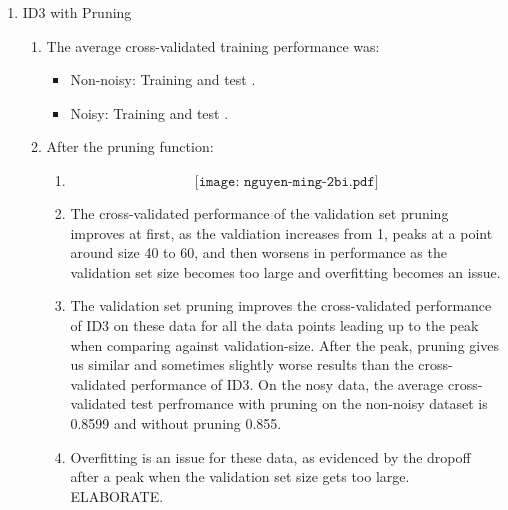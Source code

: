 \documentclass[11pt]{article}
\begin{document}
\begin{enumerate}
\item ID3 with Pruning
\begin{enumerate}
\item The average cross-validated training performance was:
	\begin{itemize}
	\item Non-noisy: Training  and test .
	\item Noisy: Training  and test .
	\end{itemize}
\item After the pruning function:
	\begin{enumerate}
	\item $$\texttt{[image: nguyen-ming-2bi.pdf]}$$
	\item The cross-validated performance of the validation set pruning improves at first, as the valdiation increases from 1, peaks at a point around size 40 to 60, and then worsens in performance as the validation set size becomes too large and overfitting becomes an issue.
	\item The validation set pruning improves the cross-validated performance of ID3 on these data for all the data points leading up to the peak when comparing against validation-size. After the peak, pruning gives us similar and sometimes slightly worse results than the cross-validated performance of ID3. On the nosy data, the average cross-validated test perfromance with pruning on the non-noisy dataset is 0.8599 and without pruning 0.855.
	\item Overfitting is an issue for these data, as evidenced by the dropoff after a peak when the validation set size gets too large. ELABORATE.
	\end{enumerate}
\end{enumerate}


\end{enumerate}
\end{document}
